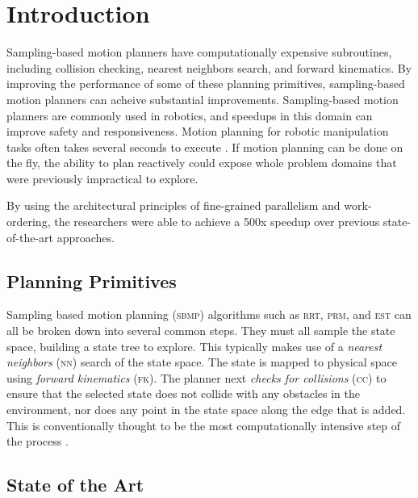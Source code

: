 \documentclass{article}
\newcommand{\todo}[1]{\textbf{\color{red}#1}}
\begin{document}
\section{Introduction}

Sampling-based motion planners have computationally expensive subroutines, including collision checking, nearest neighbors search, and forward kinematics. By improving the performance of some of these planning primitives, sampling-based motion planners can acheive substantial improvements. Sampling-based motion planners are commonly used in robotics, and speedups in this domain can improve safety and responsiveness. Motion planning for robotic manipulation tasks often takes several seconds to execute \cite{paper:MiM}. If motion planning can be done on the fly, the ability to plan reactively could expose whole problem domains that were previously impractical to explore. %

By using the architectural principles of fine-grained parallelism and work-ordering, the researchers were able to achieve a 500x speedup over previous state-of-the-art approaches.

\subsection{Planning Primitives}

Sampling based motion planning (\textsc{sbmp}) algorithms such as \textsc{rrt}, \textsc{prm}, and \textsc{est} \cite{paper:OMPL} can all be broken down into several common steps. They must all sample the state space, building a state tree to explore. This typically makes use of a \textit{nearest neighbors} (\textsc{nn}) search of the state space. The state is mapped to physical space using \textit{forward kinematics} (\textsc{fk}). The planner next \textit{checks for collisions} (\textsc{cc}) to ensure that the selected state does not collide with any obstacles in the environment, nor does any point in the state space along the edge that is added. This is conventionally thought to be the most computationally intensive step of the process \cite{paper:MiM}. 


\subsection{State of the Art}
\end{document}
